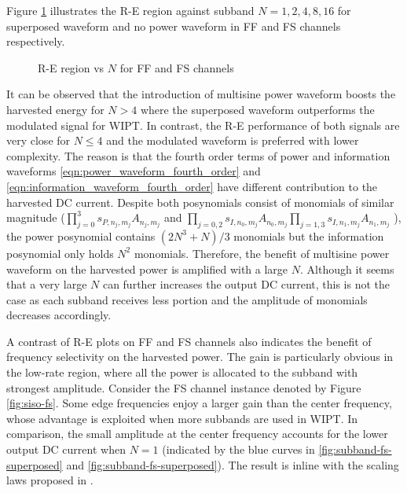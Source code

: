 Figure \ref{fig:siso-subband} illustrates the R-E region against subband $N = 1,2,4,8,16$ for superposed waveform and no power waveform in FF and FS channels respectively.

\begin{figure}[ht]
  \centering
  \quad
  \caption{R-E region vs $N$ for FF and FS channels}\label{fig:siso-subband}
\end{figure}

It can be observed that the introduction of multisine power waveform boosts the harvested energy for $N > 4$ where the superposed waveform outperforms the modulated signal for WIPT. In contrast, the R-E performance of both signals are very close for $N \leqslant 4$ and the modulated waveform is preferred with lower complexity. The reason is that the fourth order terms of power and information waveforms \ref{eqn:power_waveform_fourth_order} and \ref{eqn:information_waveform_fourth_order} have different contribution to the harvested DC current. Despite both posynomials consist of monomials of similar magnitude (${\prod\nolimits_{j = 0}^3 {{s_{P,{n_j},{m_j}}}{A_{{n_j},{m_j}}}} }$ and $\prod\nolimits_{j = 0,2} {{s_{I,{n_0},{m_j}}}{A_{{n_0},{m_j}}}} \prod\nolimits_{j = 1,3} {{s_{I,{n_1},{m_j}}}{A_{{n_1},{m_j}}}} $ ), the power posynomial contains $(2{N^3} + N)/3$ monomials but the information posynomial only holds ${N^2}$ monomials. Therefore, the benefit of multisine power waveform on the harvested power is amplified with a large $N$. Although it seems that a very large $N$ can further increases the output DC current, this is not the case as each subband receives less portion and the amplitude of monomials decreases accordingly.

A contrast of R-E plots on FF and FS channels also indicates the benefit of frequency selectivity on the harvested power. The gain is particularly obvious in the low-rate region, where all the power is allocated to the subband with strongest amplitude. Consider the FS channel instance denoted by Figure \ref{fig:siso-fs}. Some edge frequencies enjoy a larger gain than the center frequency, whose advantage is exploited when more subbands are used in WIPT. In comparison, the small amplitude at the center frequency accounts for the lower output DC current when $N = 1$ (indicated by the blue curves in \ref{fig:subband-fs-superposed} and \ref{fig:subband-fs-superposed}). The result is inline with the scaling laws proposed in \cite{Clerckx2018}.

